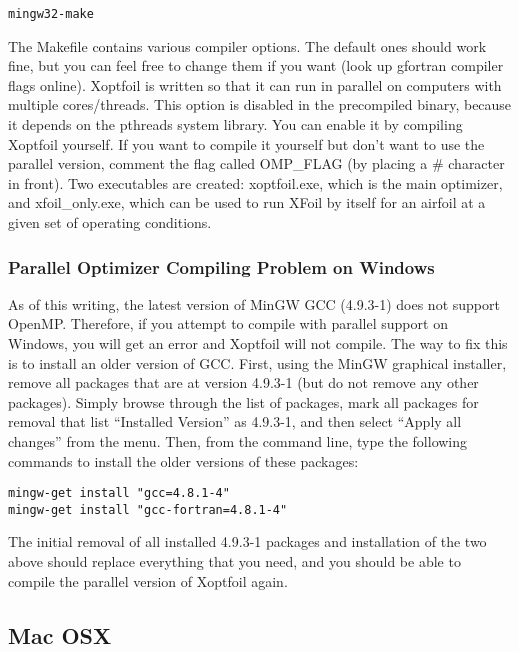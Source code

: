 \documentclass[11pt]{article}
\begin{document}
\begin{verbatim}
mingw32-make
\end{verbatim}

The Makefile contains various compiler options.  The default ones should work fine, but
you can feel free to change them if you want (look up gfortran compiler flags online).
Xoptfoil is written so that it can run in parallel on computers with multiple
cores/threads.  This option is disabled in the precompiled binary, because it depends on
the pthreads system library.  You can enable it by compiling Xoptfoil yourself.  If you
want to compile it yourself but don't want to use the parallel version, comment the flag
called OMP\_FLAG (by placing a \# character in front). Two executables are
created: xoptfoil.exe, which is the main optimizer, and xfoil\_only.exe, which can be 
used to run XFoil by itself for an airfoil at a given set of operating conditions.

\subsubsection{Parallel Optimizer Compiling Problem on Windows}

As of this writing, the latest version of MinGW GCC (4.9.3-1) does not support OpenMP.
Therefore, if you attempt to compile with parallel support on Windows, you will get an
error and Xoptfoil will not compile.  The way to fix this is to install an older version
of GCC.  First, using the MinGW graphical installer, remove all packages that are at 
version 4.9.3-1 (but do not remove any other packages). Simply browse through the list of
packages, mark all packages for removal that list ``Installed Version'' as 4.9.3-1, and 
then select ``Apply all changes'' from the menu.  Then, from the command line, type 
the following commands to install the older versions of these packages:

\begin{verbatim}
mingw-get install "gcc=4.8.1-4"
mingw-get install "gcc-fortran=4.8.1-4"
\end{verbatim}

The initial removal of all installed 4.9.3-1 packages and installation of the two above
should replace everything that you need, and you should be able to compile the parallel
version of Xoptfoil again.

\subsection{Mac OSX}
\end{document}
